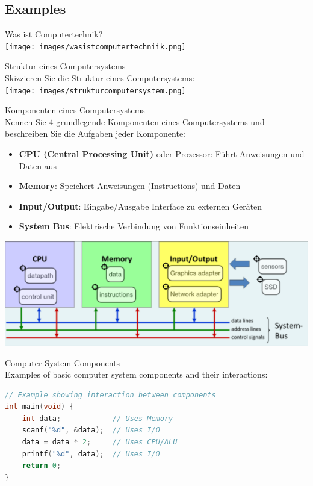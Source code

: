 \subsection{Examples}

\begin{example2}{Was ist Computertechnik?}\\
  \texttt{[image: images/wasistcomputertechniik.png]}
\end{example2}

\begin{example2}{Struktur eines Computersystems}\\
Skizzieren Sie die Struktur eines Computersystems:\\
\texttt{[image: images/strukturcomputersystem.png]}
\end{example2}

\begin{example2}{Komponenten eines Computersystems}\\
Nennen Sie 4 grundlegende Komponenten eines Computersystems und beschreiben Sie die Aufgaben jeder Komponente:
\begin{itemize}
  \item \textbf{CPU (Central Processing Unit)} oder Prozessor: Führt Anweisungen und Daten aus
  \item \textbf{Memory}: Speichert Anweisungen (Instructions) und Daten
  \item \textbf{Input/Output}: Eingabe/Ausgabe Interface zu externen Geräten
  \item \textbf{System Bus}: Elektrische Verbindung von Funktionseinheiten
\end{itemize}
\includegraphics[width=\linewidth]{images/komponentenversion2.png}
\end{example2}



\begin{example2}{Computer System Components}\\
Examples of basic computer system components and their interactions:

\begin{lstlisting}[language=C, style=basesmol]
// Example showing interaction between components
int main(void) {
    int data;            // Uses Memory
    scanf("%d", &data);  // Uses I/O
    data = data * 2;     // Uses CPU/ALU
    printf("%d", data);  // Uses I/O
    return 0;
}
\end{lstlisting}
\end{example2}

